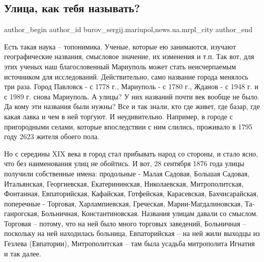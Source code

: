  
 
 
 
 
 
\subsection{Улица, как тебя называть?}
\label{sec:28_01_2018.stz.news.ua.mrpl_city.1.ulica_kak_tebja_nazyvat}
 
\ifcmt
 author_begin
   author_id burov_sergij.mariupol,news.ua.mrpl_city
 author_end
\fi


Есть такая наука – топонимика. Ученые, которые ею занимаются, изучают
географические названия, смысловое значение, их изменения и т.п. Так вот, для
этих ученых наш благословенный Мариуполь может стать неисчерпаемым источником
для исследований. Действительно, само название города менялось три раза. Город
Павловск - с 1778 г., Мариуполь - с 1780 г., Жданов - с 1948 г. и с 1989 г.
снова Мариуполь. А улицы? У них названий почти век вообще не было. Да кому эти
названия были нужны? Все и так знали, кто где живет, где базар, где какая лавка
и чем в ней торгуют. И неудивительно. Например, в городе с пригородными селами,
которые впоследствии с ним слились, проживало в 1795 году 2623 жителя обоего
пола.


Но с середины XIX века в город стал прибывать народ со стороны, и стало ясно,
что без наименования улиц не обойтись. И вот, 28 сентября 1876 года улицы
получили собственные имена: продольные - Малая Садовая, Большая Садовая,
Итальянская, Георгиевская, Екатеринин­ская, Николаевская, Митрополитская,
Фонтанная, Евпаторийская, Кафайская, Готфейская, Карасевская, Бахчисарайская,
поперечные - Торговая, Харлампиевская, Греческая, Марии-Магдалиновская,
Та­ганрогская, Больничная, Константиновская. Названия улицам давали со смыслом.
Торговая – потому, что на ней было много торговых заведений, Больничная –
поскольку на ней находилась больница, Евпаторийская – на ней жили  выходцы из
Гезлева (Евпатории), Митрополитская – там была усадьба митрополита Игнатия и
так далее.

